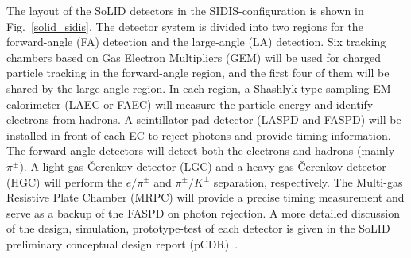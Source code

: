 The layout of the SoLID detectors in the SIDIS-configuration is shown in
Fig.~\ref{solid_sidis}. The detector system is divided into two regions for the
forward-angle (FA) detection and the large-angle (LA) detection. Six tracking
chambers based on Gas Electron Multipliers (GEM) will be used for charged
particle tracking in the forward-angle region, and the first four of them will
be shared by the large-angle
region. In each region, a Shashlyk-type sampling EM calorimeter (LAEC or
FAEC) will measure the particle energy and identify electrons from hadrons. A
scintillator-pad detector (LASPD and FASPD) will be installed in front of each
EC to reject photons and provide timing information. The forward-angle
detectors will detect both the electrons and hadrons (mainly $\pi^{\pm}$). A
light-gas \v{C}erenkov detector (LGC) and a heavy-gas \v{C}erenkov detector
(HGC) will perform the $e/\pi^{\pm}$ and $\pi^{\pm}/K^{\pm}$ separation,
respectively. The Multi-gas Resistive Plate Chamber (MRPC) will provide a
precise timing measurement and serve as a backup of the FASPD on photon
rejection. A more detailed discussion of the design, simulation, prototype-test
of each detector is given in the SoLID preliminary conceptual design report
(pCDR)~\cite{solid_pcdr}.

